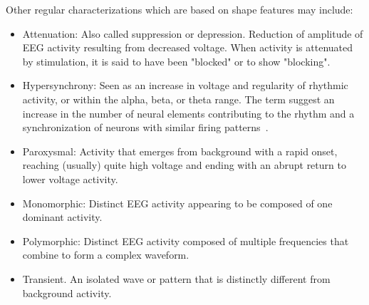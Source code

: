 Other regular characterizations which are based on shape features may include:

\begin{itemize}
\item Attenuation: Also called suppression or depression. Reduction of amplitude of EEG activity resulting from decreased voltage. When activity is attenuated by stimulation, it is said to have been "blocked" or to show "blocking".
\item Hypersynchrony: Seen as an increase in voltage and regularity of rhythmic activity, or within the alpha, beta, or theta range. The term suggest an increase in the number of neural elements contributing to the rhythm and a synchronization of neurons with similar firing patterns~\cite{Buzsaki2012}.
\item Paroxysmal: Activity that emerges from background with a rapid onset, reaching (usually) quite high voltage and ending with an abrupt return to lower voltage activity. 
\end{itemize}

\begin{itemize}
\item Monomorphic: Distinct EEG activity appearing to be composed of one dominant activity.
\item Polymorphic: Distinct EEG activity composed of multiple frequencies that combine to form a complex waveform.
\item Transient. An isolated wave or pattern that is distinctly different from background activity.
\end{itemize}


